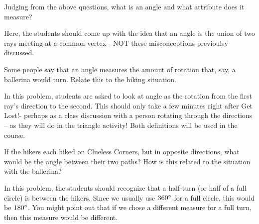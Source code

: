 \documentclass{ximera}
\begin{document}
\begin{problem}
Judging from the above questions, what is an angle and what attribute does it measure?

\begin{instructorNotes}
Here, the students should come up with the idea that an angle is the union of two rays meeting at a common vertex - NOT these misconceptions previoulsy discussed.
\end{instructorNotes}
\end{problem}


\begin{problem}
Some people say that an angle measures the amount of rotation that, say, a ballerina would turn. Relate this to the hiking situation.
\begin{instructorNotes}
     In this problem, students are asked to look at angle as the rotation from the first ray’s direction to the second.  This should only take a few minutes right after Get Lost!- perhaps as a class discussion with a person rotating through the directions – as they will do in the triangle activity!
    Both definitions will be used in the course.
\end{instructorNotes}
\end{problem}   

\newpage

\begin{problem}
If the hikers each hiked on Clueless Corners, but in opposite directions, what would be the angle between their two paths?  How is this related to the situation with the ballerina?

\begin{instructorNotes}
In this problem, the students should recognize that a half-turn (or half of a full circle) is between the hikers.  Since we usually use $360\degree$ for a full circle, this would be $180\degree$.  You might point out that if we chose a different measure for a full turn, then this measure would be different.
\end{instructorNotes}
\end{problem}
\end{document}
